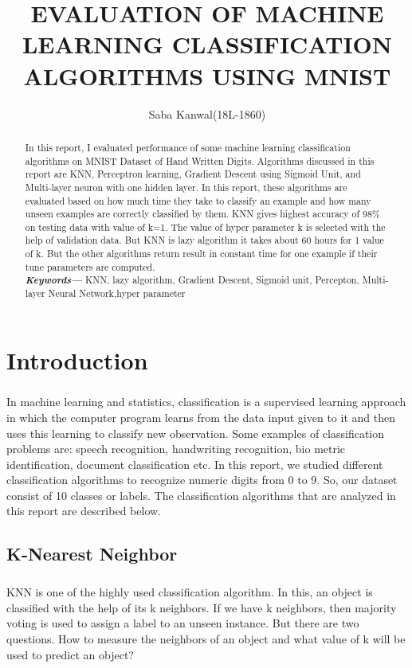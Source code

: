 \documentclass[]{report}
\title{EVALUATION OF MACHINE
	LEARNING CLASSIFICATION ALGORITHMS
	USING MNIST}
\author{Saba Kanwal(18L-1860)}
\begin{document}
\maketitle
\providecommand{\keywords}[1]{\textbf{\textit{Keywords---}} #1}
\begin{abstract}
		In this report, I evaluated performance of some machine learning classification algorithms on MNIST Dataset of Hand Written Digits. Algorithms discussed in this report are KNN, Perceptron learning, Gradient Descent using Sigmoid Unit, and Multi-layer neuron with one hidden layer.  In this report, these algorithms are evaluated based on how much time they take to classify an example and how many unseen examples are correctly classified by them. KNN gives highest accuracy of 98\% on testing data with value of k=1. The value of hyper parameter k is selected with the help of validation data. But KNN is lazy algorithm it takes about 60 hours for 1 value of k. But the other algorithms return result in constant time for one example if their tune parameters are computed. 
		\\
		\keywords{KNN, lazy algorithm, Gradient Descent, Sigmoid unit, Percepton, Multi-layer Neural Network,hyper parameter} 
\end{abstract}
\chapter{Introduction}
\paragraph{}In machine learning and statistics, classification is a supervised learning approach in which the computer program learns from the data input given to it and then uses this learning to classify new observation. Some examples of classification problems are: speech recognition, handwriting recognition, bio metric identification, document classification etc. In this report, we studied different classification algorithms to recognize numeric digits from 0 to 9.  So, our dataset consist of 10 classes or labels. The classification algorithms that are analyzed in this report are described below.
\section{K-Nearest Neighbor}
\paragraph{} KNN is one of the highly used classification algorithm. In this, an object is classified with the help of its k neighbors. If we have k neighbors, then majority voting is used to assign a label to an unseen instance. But there are two questions. How to measure the neighbors of an object and what value of k will be used to predict an object?
\end{document}
